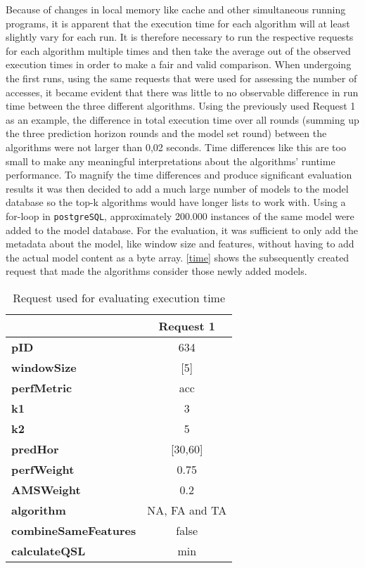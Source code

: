 Because of changes in local memory like cache and other simultaneous running programs, it is apparent that the execution time for each algorithm will at least slightly vary for each run. It is therefore necessary to run the respective requests for each algorithm multiple times and then take the average out of the observed execution times in order to make a fair and valid comparison. When undergoing the first runs, using the same requests that were used for assessing the number of accesses, it became evident that there was little to no observable difference in run time between the three different algorithms. Using the previously used Request 1 as an example, the difference in total execution time over all rounds (summing up the three prediction horizon rounds and the model set round) between the algorithms were not larger than 0,02 seconds. Time differences like this are too small to make any meaningful interpretations about the algorithms’ runtime performance. To magnify the time differences and produce significant evaluation results it was then decided to add a much large number of models to the model database so the top-k algorithms would have longer lists to work with. Using a for-loop in \texttt{postgreSQL}, approximately 200.000 instances of the same model were added to the model database. For the evaluation, it was sufficient to only add the metadata about the model, like window size and features, without having to add the actual model content as a byte array. \autoref{time} shows the subsequently created request that made the algorithms consider those newly added models.



\begin{table}[h]
\centering
    \begin{tabular}{ l | c}
        \toprule
        &
\textbf{Request 1}      
 \\\midrule

\textbf{pID} & 634 \\\midrule
\textbf{windowSize} & [5] \\\midrule
\textbf{perfMetric} & acc  \\\midrule
\textbf{k1} & 3\\\midrule
\textbf{k2} & 5 \\\midrule
\textbf{predHor} & [30,60]\\\midrule
\textbf{perfWeight} & 0.75 \\\midrule
\textbf{AMSWeight} & 0.2\\\midrule
\textbf{algorithm}  & NA, FA and TA  \\\midrule
\textbf{combineSameFeatures} & false \\\midrule
\textbf{calculateQSL} & min \\
        \bottomrule
    \end{tabular}
\caption{Request used for evaluating execution time} \label{time}
\end{table}


